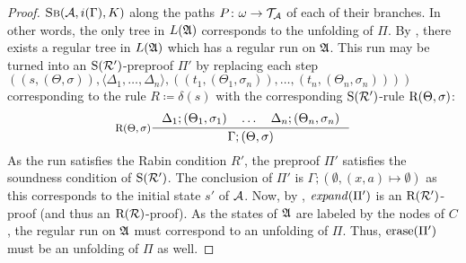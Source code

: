 \begin{proof}
  $\textsc{Sb}(\mathcal{A}, i(\Gamma), K)$ along the paths $P \colon \omega \to \mathcal{T}_{\mathcal{A}}$ of each of
  their branches. In other words, the only tree in $L(\mathfrak{A})$ corresponds to the unfolding of
  $\Pi$.
  By , there exists a regular tree in $L(\mathfrak{A})$ which has
  a regular run on $\mathfrak{A}$. This run may be turned into an
  $\mathrm{S}(\mathcal{R}')$-preproof $\Pi'$ by
  replacing each step $((s, (\Theta, \sigma)), \langle \Delta_1, \ldots,
  \Delta_n \rangle, ((t_1, (\Theta_1, \sigma_n)), \ldots, (t_n,
  (\Theta_n, \sigma_n))))$ corresponding to the rule $R \coloneq \delta(s)$ with the
  corresponding $\mathrm{S}(\mathcal{R}')$-rule $\mathrm{R}(\Theta, \sigma)$:
  \[\inference[$\Rrr(\Theta, \sigma)$]{\Delta_1; (\Theta_1, \sigma_1) \quad
      \ldots \quad \Delta_n ; (\Theta_n, \sigma_n)}{\Gamma ; (\Theta, \sigma)}\]
  As the run satisfies the Rabin condition $R'$, the preproof $\Pi'$ satisfies the
  soundness condition of $\mathrm{S}(\mathcal{R}')$. The conclusion of $\Pi'$ is $\Gamma ;
  (\emptyset, (x, a) \mapsto \emptyset)$ as this corresponds to the initial
  state $s'$ of $\mathcal{A}$. Now, by , $\mathit{expand}(\Pi')$ is an
  $\mathrm{R}(\mathcal{R}')$-proof (and thus an $\mathrm{R}(\mathcal{R})$-proof). As the states of $\mathfrak{A}$ are
  labeled by the nodes of $C$, the regular run on $\mathfrak{A}$ must correspond to an
  unfolding of $\Pi$. Thus, $\mathrm{erase}(\Pi')$ must be an unfolding of $\Pi$ as well.
\end{proof}

